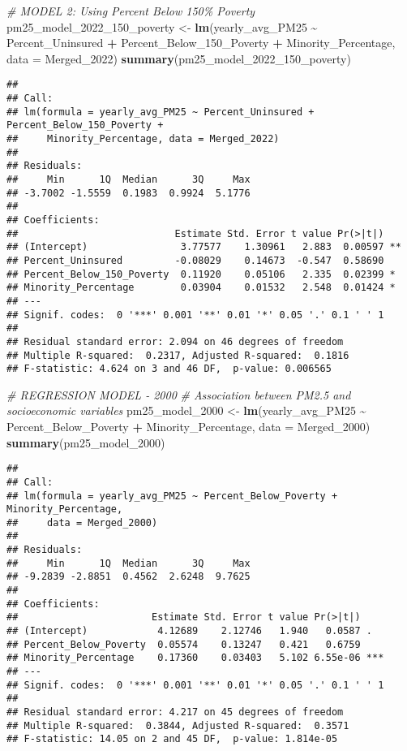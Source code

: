 \documentclass[
]{article}
\newenvironment{Shaded}{\begin{snugshade}}{\end{snugshade}}
\newcommand{\AttributeTok}[1]{\textcolor[rgb]{0.13,0.29,0.53}{#1}}
\newcommand{\CommentTok}[1]{\textcolor[rgb]{0.56,0.35,0.01}{\textit{#1}}}
\newcommand{\FunctionTok}[1]{\textcolor[rgb]{0.13,0.29,0.53}{\textbf{#1}}}
\newcommand{\NormalTok}[1]{#1}
\newcommand{\OtherTok}[1]{\textcolor[rgb]{0.56,0.35,0.01}{#1}}
\newcommand{\SpecialCharTok}[1]{\textcolor[rgb]{0.81,0.36,0.00}{\textbf{#1}}}
\begin{document}
\begin{Shaded}
\begin{Highlighting}[]
\CommentTok{\# MODEL 2: Using Percent Below 150\% Poverty}
\NormalTok{pm25\_model\_2022\_150\_poverty }\OtherTok{\textless{}{-}} \FunctionTok{lm}\NormalTok{(yearly\_avg\_PM25 }\SpecialCharTok{\textasciitilde{}}\NormalTok{ Percent\_Uninsured }\SpecialCharTok{+}\NormalTok{ Percent\_Below\_150\_Poverty }\SpecialCharTok{+}\NormalTok{ Minority\_Percentage, }\AttributeTok{data =}\NormalTok{ Merged\_2022)}
\FunctionTok{summary}\NormalTok{(pm25\_model\_2022\_150\_poverty)}
\end{Highlighting}
\end{Shaded}

\begin{verbatim}
## 
## Call:
## lm(formula = yearly_avg_PM25 ~ Percent_Uninsured + Percent_Below_150_Poverty + 
##     Minority_Percentage, data = Merged_2022)
## 
## Residuals:
##     Min      1Q  Median      3Q     Max 
## -3.7002 -1.5559  0.1983  0.9924  5.1776 
## 
## Coefficients:
##                           Estimate Std. Error t value Pr(>|t|)   
## (Intercept)                3.77577    1.30961   2.883  0.00597 **
## Percent_Uninsured         -0.08029    0.14673  -0.547  0.58690   
## Percent_Below_150_Poverty  0.11920    0.05106   2.335  0.02399 * 
## Minority_Percentage        0.03904    0.01532   2.548  0.01424 * 
## ---
## Signif. codes:  0 '***' 0.001 '**' 0.01 '*' 0.05 '.' 0.1 ' ' 1
## 
## Residual standard error: 2.094 on 46 degrees of freedom
## Multiple R-squared:  0.2317, Adjusted R-squared:  0.1816 
## F-statistic: 4.624 on 3 and 46 DF,  p-value: 0.006565
\end{verbatim}

\begin{Shaded}
\begin{Highlighting}[]
\CommentTok{\# REGRESSION MODEL {-} 2000}
\CommentTok{\# Association between PM2.5 and socioeconomic variables}
\NormalTok{pm25\_model\_2000 }\OtherTok{\textless{}{-}} \FunctionTok{lm}\NormalTok{(yearly\_avg\_PM25 }\SpecialCharTok{\textasciitilde{}}\NormalTok{ Percent\_Below\_Poverty }\SpecialCharTok{+}\NormalTok{ Minority\_Percentage, }\AttributeTok{data =}\NormalTok{ Merged\_2000)}
\FunctionTok{summary}\NormalTok{(pm25\_model\_2000)}
\end{Highlighting}
\end{Shaded}

\begin{verbatim}
## 
## Call:
## lm(formula = yearly_avg_PM25 ~ Percent_Below_Poverty + Minority_Percentage, 
##     data = Merged_2000)
## 
## Residuals:
##     Min      1Q  Median      3Q     Max 
## -9.2839 -2.8851  0.4562  2.6248  9.7625 
## 
## Coefficients:
##                       Estimate Std. Error t value Pr(>|t|)    
## (Intercept)            4.12689    2.12746   1.940   0.0587 .  
## Percent_Below_Poverty  0.05574    0.13247   0.421   0.6759    
## Minority_Percentage    0.17360    0.03403   5.102 6.55e-06 ***
## ---
## Signif. codes:  0 '***' 0.001 '**' 0.01 '*' 0.05 '.' 0.1 ' ' 1
## 
## Residual standard error: 4.217 on 45 degrees of freedom
## Multiple R-squared:  0.3844, Adjusted R-squared:  0.3571 
## F-statistic: 14.05 on 2 and 45 DF,  p-value: 1.814e-05
\end{verbatim}
\end{document}
